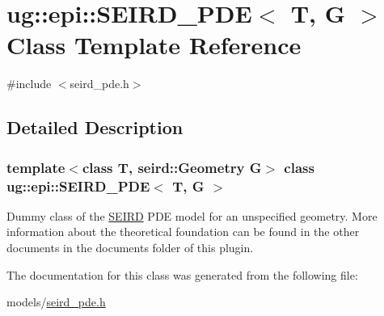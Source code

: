 \hypertarget{classug_1_1epi_1_1_s_e_i_r_d___p_d_e}{}\section{ug\+:\+:epi\+:\+:S\+E\+I\+R\+D\+\_\+\+P\+DE$<$ T, G $>$ Class Template Reference}
\label{classug_1_1epi_1_1_s_e_i_r_d___p_d_e}


{\ttfamily \#include $<$seird\+\_\+pde.\+h$>$}



\subsection{Detailed Description}
\subsubsection*{template$<$class T, seird\+::\+Geometry G$>$\newline
class ug\+::epi\+::\+S\+E\+I\+R\+D\+\_\+\+P\+D\+E$<$ T, G $>$}

Dummy class of the \hyperlink{classug_1_1epi_1_1_s_e_i_r_d}{S\+E\+I\+RD} P\+DE model for an unspecified geometry. More information about the theoretical foundation can be found in the other documents in the documents folder of this plugin. 

The documentation for this class was generated from the following file\+:\begin{DoxyCompactItemize}
\item 
models/\hyperlink{seird__pde_8h}{seird\+\_\+pde.\+h}\end{DoxyCompactItemize}
